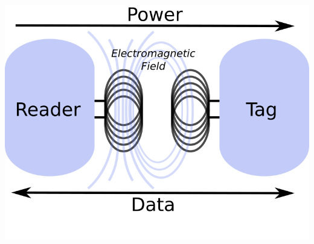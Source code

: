 \documentclass[unknownkeysallowed]{beamer}
\begin{document}
\begin{frame}
\begin{center}
\begin{minipage}{.9\textwidth}
\begin{columns}[T]
\begin{column}{.5\textwidth}
\begin{block}{}
\begin{center}
     \includegraphics[width=0.4\paperwidth]{figures/emitterAndTag.png}
     \end{center}
    \end{block}
    \end{column}
  \end{columns}
  \end{minipage}\end{center}
\end{frame}
\end{document}
